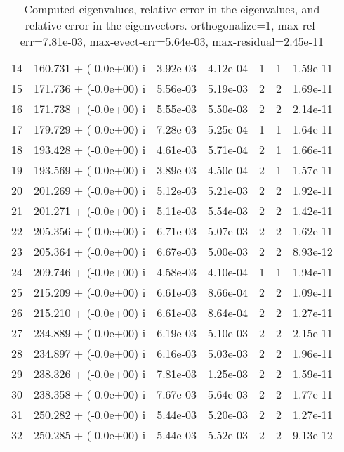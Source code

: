 \begin{table}[H]
\begin{center}
\begin{tabular}{|c|c|c|c|c|c|c|}
    14  &    160.731 + (-0.0e+00) i  &    3.92e-03      &   4.12e-04    &   1    &  1   &    1.59e-11 \\
    15  &    171.736 + (-0.0e+00) i  &    5.56e-03      &   5.19e-03    &   2    &  2   &    1.69e-11 \\
    16  &    171.738 + (-0.0e+00) i  &    5.55e-03      &   5.50e-03    &   2    &  2   &    2.14e-11 \\
    17  &    179.729 + (-0.0e+00) i  &    7.28e-03      &   5.25e-04    &   1    &  1   &    1.64e-11 \\
    18  &    193.428 + (-0.0e+00) i  &    4.61e-03      &   5.71e-04    &   2    &  1   &    1.66e-11 \\
    19  &    193.569 + (-0.0e+00) i  &    3.89e-03      &   4.50e-04    &   2    &  1   &    1.57e-11 \\
    20  &    201.269 + (-0.0e+00) i  &    5.12e-03      &   5.21e-03    &   2    &  2   &    1.92e-11 \\
    21  &    201.271 + (-0.0e+00) i  &    5.11e-03      &   5.54e-03    &   2    &  2   &    1.42e-11 \\
    22  &    205.356 + (-0.0e+00) i  &    6.71e-03      &   5.07e-03    &   2    &  2   &    1.62e-11 \\
    23  &    205.364 + (-0.0e+00) i  &    6.67e-03      &   5.00e-03    &   2    &  2   &    8.93e-12 \\
    24  &    209.746 + (-0.0e+00) i  &    4.58e-03      &   4.10e-04    &   1    &  1   &    1.94e-11 \\
    25  &    215.209 + (-0.0e+00) i  &    6.61e-03      &   8.66e-04    &   2    &  2   &    1.09e-11 \\
    26  &    215.210 + (-0.0e+00) i  &    6.61e-03      &   8.64e-04    &   2    &  2   &    1.27e-11 \\
    27  &    234.889 + (-0.0e+00) i  &    6.19e-03      &   5.10e-03    &   2    &  2   &    2.15e-11 \\
    28  &    234.897 + (-0.0e+00) i  &    6.16e-03      &   5.03e-03    &   2    &  2   &    1.96e-11 \\
    29  &    238.326 + (-0.0e+00) i  &    7.81e-03      &   1.25e-03    &   2    &  2   &    1.59e-11 \\
    30  &    238.358 + (-0.0e+00) i  &    7.67e-03      &   5.64e-03    &   2    &  2   &    1.77e-11 \\
    31  &    250.282 + (-0.0e+00) i  &    5.44e-03      &   5.20e-03    &   2    &  2   &    1.27e-11 \\
    32  &    250.285 + (-0.0e+00) i  &    5.44e-03      &   5.52e-03    &   2    &  2   &    9.13e-12 \\
\hline
\end{tabular}
\caption{Computed eigenvalues, relative-error in the eigenvalues, and relative error in the eigenvectors. orthogonalize=1, max-rel-err=7.81e-03, max-evect-err=5.64e-03, max-residual=2.45e-11
}\label{table:genEigspipeze4.order2.hdf}
\end{center}
\end{table}
